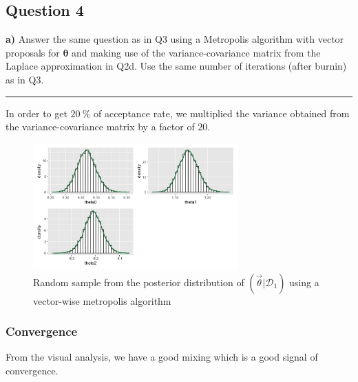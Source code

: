 \subsection*{Question 4}

\textbf{a)} Answer the same question as in Q3 using a Metropolis algorithm with vector proposals for $\bm{\theta}$ and making use of the variance-covariance matrix from the Laplace approximation in Q2d. Use the same number of iterations (after burnin) as in Q3.

\begin{center}\rule{6cm}{0.4pt}\end{center}

In order to get $\SI{20}{\percent}$ of acceptance rate, we multiplied the variance obtained from the variance-covariance matrix by a factor of $20$.

\begin{figure}[H]
	\centering
	\includegraphics[width=0.7\textwidth]{figures/metropolis_vw/metropolis_vw_samples.png}
	\caption{Random sample from the posterior distribution of $(\vec{\theta}|\mathcal{D}_1)$ using a vector-wise metropolis algorithm}
	\label{fig:metropolis_vw_samples}
\end{figure}

\subsubsection*{Convergence}

From the visual analysis, we have a good mixing which is a good signal of convergence.

